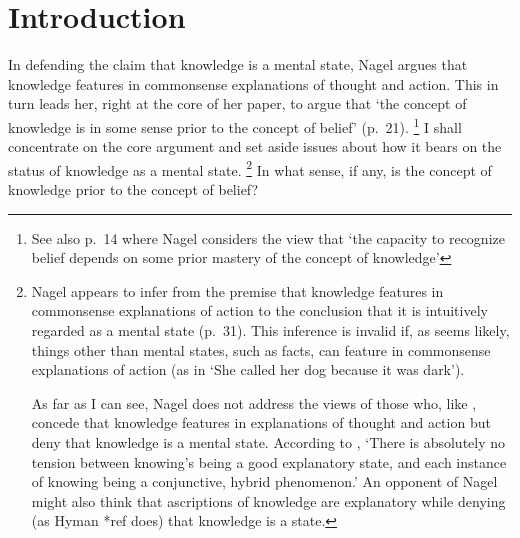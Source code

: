 \documentclass[11pt,a4paper]{extarticle}
\begin{document}
\setlength\footnotesep{1em}




\maketitle

\begin{abstract}
\noindent
***


\end{abstract}



\section{Introduction}
In defending the claim that knowledge is a mental state, Nagel argues that knowledge features in commonsense explanations of thought and action.
This in turn leads her, right at the core of her paper, to argue that  `the concept of knowledge is in some sense prior to the concept of belief' (p.\ 21).%
\footnote{
See also p.\ 14 where Nagel considers the view that `the capacity to recognize belief depends on some prior mastery of the concept of knowledge'
}
I shall concentrate on the core argument and set aside issues about how it bears on the status of knowledge as a mental state.%
\footnote{
Nagel appears to infer from the premise that knowledge features in commonsense explanations of action to the conclusion that it  is intuitively regarded as a mental state (p.\ 31).
This inference is invalid if, as seems likely, things other than mental states, such as facts, can feature in commonsense explanations of action (as in `She called her dog because it was dark').

As far as I can see, Nagel does not address the views of those who, like \citet{fricker_2009}, concede that knowledge features in explanations of thought and action but deny that knowledge is a mental state.
According to \citet[p.\ 51]{fricker_2009}, `There is absolutely no tension between knowing's being a good explanatory state, and each instance of knowing being a conjunctive, hybrid phenomenon.'
An opponent of Nagel might also think that ascriptions of knowledge are explanatory while denying (as Hyman *ref does) that knowledge is a state.
}
In what sense, if any, is the concept of knowledge prior to the concept of belief?
\end{document}
